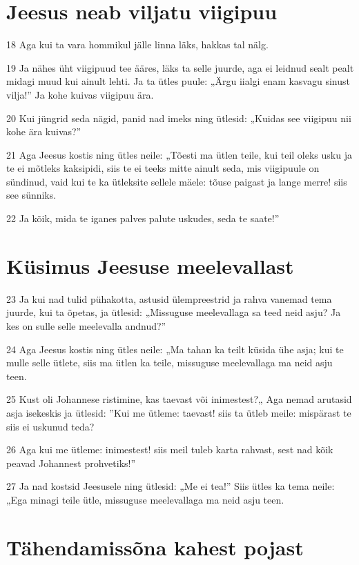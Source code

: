 \section*{Jeesus neab viljatu viigipuu}

\par 18 Aga kui ta vara hommikul jälle linna läks, hakkas tal nälg.
\par 19 Ja nähes üht viigipuud tee ääres, läks ta selle juurde, aga ei leidnud sealt pealt midagi muud kui ainult lehti. Ja ta ütles puule: „Ärgu iialgi enam kasvagu sinust vilja!” Ja kohe kuivas viigipuu ära.
\par 20 Kui jüngrid seda nägid, panid nad imeks ning ütlesid: „Kuidas see viigipuu nii kohe ära kuivas?”
\par 21 Aga Jeesus kostis ning ütles neile: „Tõesti ma ütlen teile, kui teil oleks usku ja te ei mõtleks kaksipidi, siis te ei teeks mitte ainult seda, mis viigipuule on sündinud, vaid kui te ka ütleksite sellele mäele: tõuse paigast ja lange merre! siis see sünniks.
\par 22 Ja kõik, mida te iganes palves palute uskudes, seda te saate!”

\section*{Küsimus Jeesuse meelevallast}

\par 23 Ja kui nad tulid pühakotta, astusid ülempreestrid ja rahva vanemad tema juurde, kui ta õpetas, ja ütlesid: „Missuguse meelevallaga sa teed neid asju? Ja kes on sulle selle meelevalla andnud?”
\par 24 Aga Jeesus kostis ning ütles neile: „Ma tahan ka teilt küsida ühe asja; kui te mulle selle ütlete, siis ma ütlen ka teile, missuguse meelevallaga ma neid asju teen.
\par 25 Kust oli Johannese ristimine, kas taevast või inimestest?„ Aga nemad arutasid asja isekeskis ja ütlesid: ”Kui me ütleme: taevast! siis ta ütleb meile: mispärast te siis ei uskunud teda?
\par 26 Aga kui me ütleme: inimestest! siis meil tuleb karta rahvast, sest nad kõik peavad Johannest prohvetiks!”
\par 27 Ja nad kostsid Jeesusele ning ütlesid: „Me ei tea!” Siis ütles ka tema neile: „Ega minagi teile ütle, missuguse meelevallaga ma neid asju teen.

\section*{Tähendamissõna kahest pojast}

